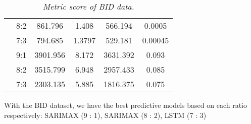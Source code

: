\documentclass{ieeeojies}
\begin{document}
\begin{table}[H]
\begin{tabular}{|c|c|c|c|c|c|}
\rowcolor[HTML]{FFB6AF} 
\cellcolor[HTML]{FFB6AF}{\color[HTML]{000000} }                                                                                         & {\color[HTML]{FE0000} 8:2}            & {\color[HTML]{FE0000} 861.796}       & {\color[HTML]{FE0000} 1.408}         & {\color[HTML]{FE0000} 566.194}      & {\color[HTML]{FE0000} 0.0005}        \\ \cline{2-6} 
\rowcolor[HTML]{FFB6AF} 
\multirow{-3}{*}{\cellcolor[HTML]{FFB6AF}{\color[HTML]{000000} \textbf{SARIMAX}}}                                                       & {\color[HTML]{000000} 7:3}            & {\color[HTML]{000000} 794.685}       & {\color[HTML]{000000} 1.3797}        & {\color[HTML]{000000} 529.181}      & {\color[HTML]{000000} 0.00045}       \\ \hline
\rowcolor[HTML]{FBC193} 
\cellcolor[HTML]{FBC193}{\color[HTML]{000000} }                                                                                         & {\color[HTML]{000000} 9:1}            & {\color[HTML]{000000} 3901.956}      & {\color[HTML]{000000} 8.172}         & {\color[HTML]{000000} 3631.392}     & {\color[HTML]{000000} 0.093}         \\ \cline{2-6} 
\rowcolor[HTML]{FBC193} 
\cellcolor[HTML]{FBC193}{\color[HTML]{000000} }                                                                                         & {\color[HTML]{000000} 8:2}            & {\color[HTML]{000000} 3515.799}      & {\color[HTML]{000000} 6.948}         & {\color[HTML]{000000} 2957.433}     & {\color[HTML]{000000} 0.085}         \\ \cline{2-6} 
\rowcolor[HTML]{FBC193} 
\multirow{-3}{*}{\cellcolor[HTML]{FBC193}{\color[HTML]{000000} \textbf{FCN}}}                                                           & {\color[HTML]{000000} 7:3}            & {\color[HTML]{000000} 2303.135}      & {\color[HTML]{000000} 5.885}         & {\color[HTML]{000000} 1816.375}     & {\color[HTML]{000000} 0.075}         \\ \hline
\end{tabular}
\caption{\centering \textit{Metric score of BID data.}}
\end{table}
With the BID dataset, we have the best predictive models based on each ratio respectively: SARIMAX (9 : 1), SARIMAX (8 : 2), LSTM (7 : 3)
\end{document}
